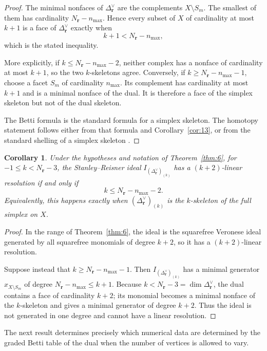 \documentclass[11pt]{amsart}
\newtheorem{corollary}[theorem]{Corollary}
\theoremstyle{definition}
\theoremstyle{remark}
\begin{document}
	\begin{proof}
		The minimal nonfaces of $\Delta_{\mathbf r}^\vee$ are the complements $X\setminus S_m$. The smallest of them has cardinality $N_{\mathbf r}-n_{\max}$. Hence every subset of $X$ of cardinality at most $k+1$ is a face of $\Delta_{\mathbf r}^\vee$ exactly when
		\[
		k+1<N_{\mathbf r}-n_{\max},
		\]
		which is the stated inequality.
		
		More explicitly, if $k\le N_{\mathbf r}-n_{\max}-2$, neither complex has a nonface of cardinality at most $k+1$, so the two $k$-skeletons agree. Conversely, if $k\ge N_{\mathbf r}-n_{\max}-1$, choose a facet $S_m$ of cardinality $n_{\max}$. Its complement has cardinality at most $k+1$ and is a minimal nonface of the dual. It is therefore a face of the simplex skeleton but not of the dual skeleton.
		
		The Betti formula is the standard formula for a simplex skeleton. The homotopy statement follows either from that formula and Corollary~\ref{cor:13}, or from the standard shelling of a simplex skeleton \cite[Section~11]{Bjorner95}.
	\end{proof}
	
	\begin{corollary}\label{cor:16}
		Under the hypotheses and notation of Theorem~\ref{thm:6}, for $-1\le k<N_{\mathbf r}-3$, the Stanley--Reisner ideal $I_{(\Delta_{\mathbf r}^\vee)_{(k)}}$ has a $(k+2)$-linear resolution if and only if
		\[
		k\le N_{\mathbf r}-n_{\max}-2.
		\]
		Equivalently, this happens exactly when $(\Delta_{\mathbf r}^\vee)_{(k)}$ is the $k$-skeleton of the full simplex on $X$.
	\end{corollary}
	
	\begin{proof}
		In the range of Theorem~\ref{thm:6}, the ideal is the squarefree Veronese ideal generated by all squarefree monomials of degree $k+2$, so it has a $(k+2)$-linear resolution.
		
		Suppose instead that $k\ge N_{\mathbf r}-n_{\max}-1$. Then $I_{(\Delta_{\mathbf r}^\vee)_{(k)}}$ has a minimal generator $x_{X\setminus S_m}$ of degree $N_{\mathbf r}-n_{\max}\le k+1$. Because $k<N_{\mathbf r}-3=\dim\Delta_{\mathbf r}^\vee$, the dual contains a face of cardinality $k+2$; its monomial becomes a minimal nonface of the $k$-skeleton and gives a minimal generator of degree $k+2$. Thus the ideal is not generated in one degree and cannot have a linear resolution.
	\end{proof}
	
	The next result determines precisely which numerical data are determined by the graded Betti table of the dual when the number of vertices is allowed to vary.
	
\end{document}
